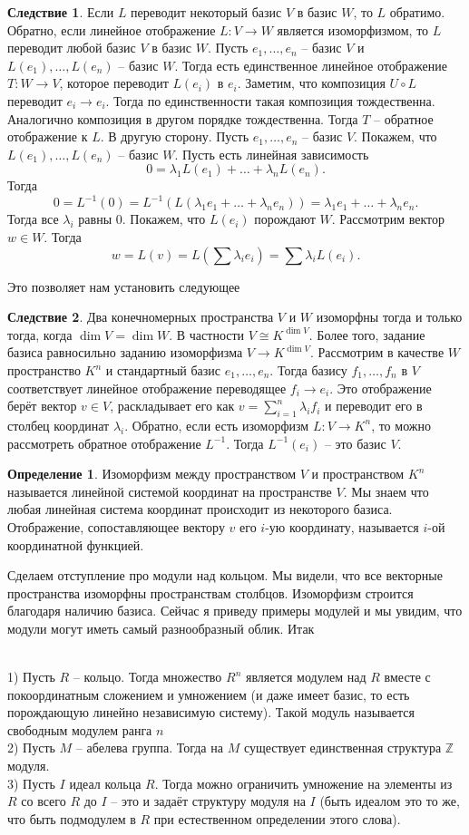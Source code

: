 \documentclass[10pt,a4paper,oneside]{book}
\theoremstyle{definition}
\newtheorem*{defn}{Определение}
\newtheorem{cor}{Следствие}
\newcommand{\mb}[1]{\mathbb{#1}}
\def\exm{\noindent {\bf Примеры:}}
\def\dfn{\begin{defn}}
\def\edfn{\end{defn}}
\def\crl{\begin{cor}}
\def\ecrl{\end{cor}}
\begin{document}
\crl Если $L$ переводит некоторый базис $V$ в базис $W$, то $L$ обратимо. Обратно, если линейное отображение $L \colon V \to W$ является изоморфизмом, то $L$ переводит любой базис $V$ в базис $W$.
\proof
Пусть $e_1,\dots,e_n$ -- базис $V$ и $L(e_1),\dots,L(e_n)$ -- базис $W$. Тогда есть единственное линейное отображение $T \colon W \to V$, которое переводит $L(e_i)$ в $e_i$. Заметим, что композиция $U\circ L$ переводит $e_i \to e_i$. Тогда по единственности такая композиция тождественна. Аналогично композиция в другом порядке тождественна. Тогда $T$ -- обратное отображение к $L$.
 В другую сторону. Пусть $e_1,\dots,e_n$ -- базис $V$. Покажем, что $L(e_1),\dots,L(e_n)$ -- базис $W$.  Пусть есть линейная зависимость  $$0=\lambda_1 L(e_1)+\dots+\lambda_n L(e_n).$$
Тогда
$$0=L^{-1}(0)=L^{-1}(L(\lambda_1 e_1+\dots+\lambda_n e_n))=\lambda_1 e_1+\dots+\lambda_n e_n.$$
Тогда все $\lambda_i$ равны 0. Покажем, что $L(e_i)$ порождают $W$. Рассмотрим вектор $w\in W$. Тогда $$w=L(v)=L\left(\sum \lambda_i e_i\right)=\sum \lambda_i L(e_i).$$
\endproof
\ecrl

Это позволяет нам установить следующее

\crl Два конечномерных пространства $V$ и $W$ изоморфны тогда и только тогда, когда $\dim V=\dim W$. В частности $V\cong K^{\dim V}$. Более того, задание базиса равносильно заданию изоморфизма $V\to K^{\dim V}$.
\proof
Рассмотрим в качестве $W$ пространство $K^n$ и стандартный базис $e_1,\dots,e_n$. Тогда базису $f_1,\dots,f_n$ в $V$ соответствует линейное отображение переводящее $f_i \to e_i$. Это отображение берёт вектор $v \in V$, раскладывает его как $v=\sum_{i=1}^n \lambda_i f_i$ и переводит его в столбец координат $\lambda_i$. Обратно, если есть изоморфизм $L\colon V \to K^n$, то можно рассмотреть обратное отображение $L^{-1}$. Тогда $L^{-1}(e_i)$ -- это базис $V$.
\endproof
\ecrl

\dfn
Изоморфизм между пространством $V$ и пространством $K^n$ называется линейной системой координат на пространстве $V$. Мы знаем что любая линейная система координат происходит из некоторого базиса. Отображение, сопоставляющее вектору $v$ его $i$-ую координату, называется $i$-ой координатной функцией.
\edfn

Сделаем отступление про модули над кольцом. Мы видели, что все векторные пространства изоморфны пространствам столбцов. Изоморфизм строится благодаря наличию базиса.
Сейчас я приведу примеры модулей и мы увидим, что модули могут иметь самый разнообразный облик. Итак


\exm\\
1) Пусть $R$ -- кольцо. Тогда множество $R^n$ является модулем над $R$ вместе с покоординатным сложением и умножением (и даже имеет базис, то есть порождающую линейно независимую систему). Такой модуль называется свободным модулем ранга $n$\\
2) Пусть $M$ -- абелева группа. Тогда на $M$ существует единственная структура $\mb Z$ модуля.\\
3) Пусть $I$ идеал кольца $R$. Тогда можно ограничить умножение на элементы из $R$ со всего $R$ до  $I$ -- это и задаёт структуру модуля на $I$ (быть идеалом это то же, что быть подмодулем в $R$ при естественном определении этого слова).
\end{document}
